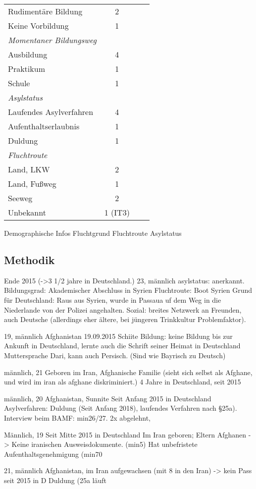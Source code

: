 \begin{table}[h!]
\begin{center}
\begin{tabular}{l|S|r|l}
      Rudimentäre Bildung & 2\\
      Keine Vorbildung & 1\\
      \hline
      \newline
      \textit{Momentaner Bildungsweg}\\
      \hline
      Ausbildung & 4\\
      Praktikum & 1\\
      Schule & 1\\
      \hline
      \newline
      \textit{Asylstatus}\\
      \hline
      Laufendes Asylverfahren & 4\\
      Aufenthaltserlaubnis  & 1\\
      Duldung & 1\\
      \hline
      \newline
      \textit{Fluchtroute}\\
      \hline
      Land, LKW & 2\\
      Land, Fußweg & 1\\
      Seeweg & 2\\
      Unbekannt & 1 (IT3)\\
      \end{tabular}
  \end{center}
\end{table}


Demographische Infos
Fluchtgrund
Fluchtroute
Asylstatus

\subsection{Methodik}

Ende 2015 (->3 1/2 jahre in Deutschland.)
23, männlich
asylstatus: anerkannt.
Bildungsgrad: Akademischer Abschluss in Syrien
Fluchtroute: Boot
Syrien
Grund für Deutschland: Raus aus Syrien, wurde in Passaua uf dem Weg in die Niederlande von der Polizei angehalten.
Sozial: breites Netzwerk an Freunden, auch Deutsche (allerdings eher ältere, bei jüngeren Trinkkultur Problemfaktor).

19, männlich
Afghanistan
19.09.2015
Schiite
Bildung: keine Bildung bis zur Ankunft in Deutschland, lernte auch die Schrift seiner Heimat in Deutschland
Muttersprache Dari, kann auch Persisch. (Sind wie Bayrisch zu Deutsch)

männlich, 21
Geboren im Iran, Afghanische Familie (sieht sich selbst als Afghane, und wird im iran als afghane diskriminiert.)
4 Jahre in Deutschland, seit 2015

männlich, 20
Afghanistan, Sunnite
Seit Anfang 2015 in Deutschland
Asylverfahren: Duldung (Seit Anfang 2018), laufendes Verfahren nach §25a). Interview beim BAMF:                        min26/27. 2x abgelehnt,

Männlich, 19
Seit Mitte 2015 in Deutschland
Im Iran geboren; Eltern Afghanen -> Keine iranischen Ausweisdokumente. (min5)
Hat unbefristete Aufenthaltsgenehmigung (min70

21, männlich
Afghanistan, im Iran aufgewachsen (mit 8 in den Iran) -> kein Pass
seit 2015 in D
Duldung (25a läuft